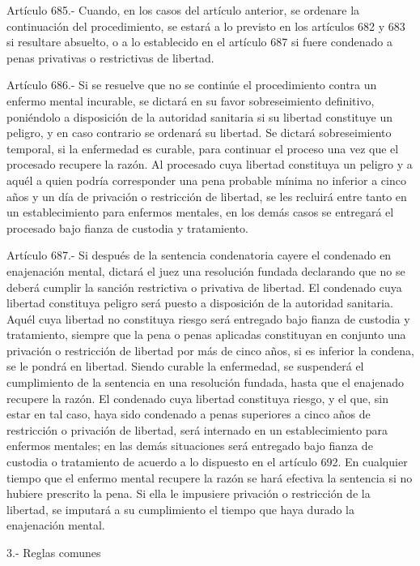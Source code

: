     Artículo 685.- Cuando, en los casos del artículo anterior, se ordenare la continuación del procedimiento, se estará a lo previsto en los artículos 682 y 683 si resultare absuelto, o a lo establecido en el artículo 687 si fuere condenado a penas privativas o restrictivas de libertad.

    Artículo 686.- Si se resuelve que no se continúe el procedimiento contra un enfermo mental incurable, se dictará en su favor sobreseimiento definitivo, poniéndolo a disposición de la autoridad sanitaria si su libertad constituye un peligro, y en caso contrario se ordenará su libertad.
    Se dictará sobreseimiento temporal, si la enfermedad es curable, para continuar el proceso una vez que el procesado recupere la razón. Al procesado cuya libertad constituya un peligro y a aquél a quien podría corresponder una pena probable mínima no inferior a cinco años y un día de privación o restricción de libertad, se les recluirá entre tanto en un establecimiento para enfermos mentales, en los demás casos se entregará el procesado bajo fianza de custodia y tratamiento.


    Artículo 687.- Si después de la sentencia condenatoria cayere el condenado en enajenación mental, dictará el juez una resolución fundada declarando que no se deberá cumplir la sanción restrictiva o privativa de libertad. El condenado cuya libertad constituya peligro será puesto a disposición de la autoridad sanitaria. Aquél cuya libertad no constituya riesgo será entregado bajo fianza de custodia y tratamiento, siempre que la pena o penas aplicadas constituyan en conjunto una privación o restricción de libertad por más de cinco años, si es inferior la condena, se le pondrá en libertad.
    Siendo curable la enfermedad, se suspenderá el cumplimiento de la sentencia en una resolución fundada, hasta que el enajenado recupere la razón. El condenado cuya libertad constituya riesgo, y el que, sin estar en tal caso, haya sido condenado a penas superiores a cinco años de restricción o privación de libertad, será internado en un establecimiento para enfermos mentales; en las demás situaciones será entregado bajo fianza de custodia o tratamiento de acuerdo a lo dispuesto en el artículo 692.
    En cualquier tiempo que el enfermo mental recupere la razón se hará efectiva la sentencia si no hubiere prescrito la pena. Si ella le impusiere privación o restricción de la libertad, se imputará a su cumplimiento el tiempo que haya durado la enajenación mental.

  3.- Reglas comunes


